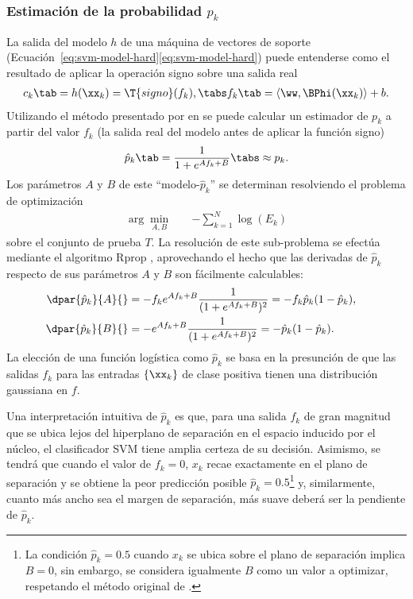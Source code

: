 %
\subsubsection{Estimación de la probabilidad ${p}_k$}
%
La salida del modelo $h$ de una máquina de vectores de soporte
(\iflatexml{}Ecuación~\ref{eq:svm-model-hard}\else\autoref{eq:svm-model-hard}\fi)
puede entenderse como el resultado de aplicar la operación signo sobre
una salida real
%
\begin{align}
\label{e3:svm-model-as-sign-fk}
  c_k \tab= h(\xx_k) = \T{signo}(f_k),\tabs
  f_k\tab=\langle\ww,\BPhi(\xx_k)\rangle+b.
\end{align}
%
Utilizando el método presentado por \citeauthor{platt} en \cite{platt}
se puede calcular un estimador de $p_k$ a partir del valor $f_k$ (la
salida real del modelo antes de aplicar la función signo)
%
\begin{align}
\label{e3:pk-hat}
  \hat{p}_k\tab=\frac{1}{1+e^{Af_k+B}} \tabs \approx p_k.
\end{align}
%
Los parámetros $A$ y $B$ de este ``modelo-$\hat{p}_k$'' se determinan
resolviendo el problema de optimización
%
\begin{align}
  \arg\min_{A,B} \quad & -\sum_{k=1}^{N} \log(E_k)
  \label{abproblem}
\end{align}
%
sobre el conjunto de prueba $T$. La resolución de este
sub-problema se efectúa mediante el algoritmo Rprop \cite{rprop},
aprovechando el hecho que las derivadas de $\hat{p}_k$
respecto de sus parámetros $A$ y $B$ son fácilmente calculables:
%
\begin{align}
  \begin{split}
    \dpar{\hat{p}_k}{A}{}&=-f_k e^{Af_k+B}\frac{1}{(1+e^{Af_k+B})^2}
    =-f_k\hat{p}_k(1-\hat{p}_k),&\\
    \dpar{\hat{p}_k}{B}{}&=    -e^{Af_k+B}\frac{1}{(1+e^{Af_k+B})^2}
    =-   \hat{p}_k(1-\hat{p}_k).
  \end{split}
\label{e3:deriv-pk-wrt-AB}
\end{align}
%
La elección de una función logística como $\hat{p}_k$ se basa en la
presunción de que las salidas $f_k$ para las entradas $\{\xx_k\}$ de
clase positiva tienen una distribución gaussiana en $f$.

Una interpretación intuitiva de $\hat{p}_k$ es que, para una salida
$f_k$ de gran magnitud que se ubica lejos del hiperplano de separación
en el espacio inducido por el núcleo, el clasificador SVM tiene amplia
certeza de su decisión.  Asimismo, se tendrá que cuando el valor de
$f_k=0$, $x_k$ recae exactamente en el plano de separación y se
obtiene la peor predicción posible $\hat{p}_k=0.5$\footnote{La
  condición $\hat{p}_k=0.5$ cuando $x_k$ se ubica sobre el plano de
  separación implica $B=0$, sin embargo, se considera igualmente $B$
  como un valor a optimizar, respetando el método original de
  \cite{platt}.} y, similarmente, cuanto más ancho sea el margen de
separación, más suave deberá ser la pendiente de $\hat{p}_k$.
